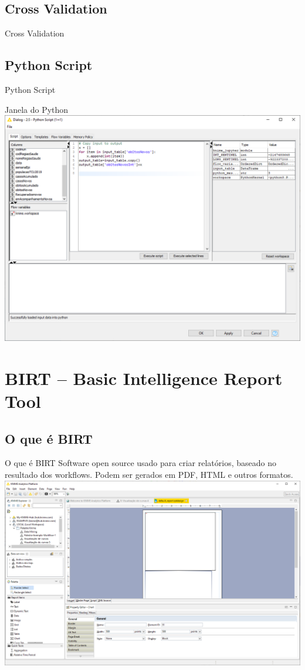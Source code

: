 \documentclass{beamer}
\begin{document}
\subsection{Cross Validation}
\begin{frame}{Cross Validation}
    \centering
    
\end{frame}


\subsection{Python Script}
\begin{frame}{Python Script}
    \centering
    
\end{frame}

\begin{frame}{Janela do Python}
    \centering
    \includegraphics[width=.7\linewidth]{Images/python2.png}
\end{frame}


\section{BIRT -- Basic Intelligence Report Tool}

\subsection{O que é BIRT}
\begin{frame}{O que é BIRT}
Software open source usado para criar relatórios, baseado no resultado dos workflows.
Podem ser gerados em PDF, HTML e outros formatos.
\vfill
\centering
\includegraphics[height=0.4\textheight]{Images/birtscreen.png}
\end{frame} 
\end{document}
